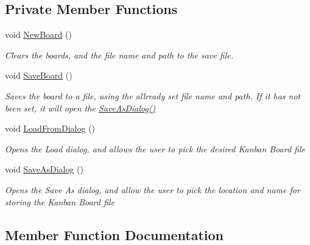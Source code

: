 \subsection*{Private Member Functions}
\begin{DoxyCompactItemize}
\item 
void \hyperlink{class_kanban_board_1_1_view_model_1_1_main_view_model_a7762a9f2331ec0b68d773570ac185ffc}{New\+Board} ()
\begin{DoxyCompactList}\small\item\em Clears the boards, and the file name and path to the save file. \end{DoxyCompactList}\item 
void \hyperlink{class_kanban_board_1_1_view_model_1_1_main_view_model_aa9116851f4b8e55c05045900745e4c39}{Save\+Board} ()
\begin{DoxyCompactList}\small\item\em Saves the board to a file, using the allready set file name and path. If it has not been set, it will open the \hyperlink{class_kanban_board_1_1_view_model_1_1_main_view_model_abdee48fdc9e1e61ffe046dc1d13c59dd}{Save\+As\+Dialog()} \end{DoxyCompactList}\item 
void \hyperlink{class_kanban_board_1_1_view_model_1_1_main_view_model_aeb9121b810fcc08bc9fbcc26c02092b5}{Load\+From\+Dialog} ()
\begin{DoxyCompactList}\small\item\em Opens the Load dialog, and allows the user to pick the desired Kanban Board file \end{DoxyCompactList}\item 
void \hyperlink{class_kanban_board_1_1_view_model_1_1_main_view_model_abdee48fdc9e1e61ffe046dc1d13c59dd}{Save\+As\+Dialog} ()
\begin{DoxyCompactList}\small\item\em Opens the Save As dialog, and allow the user to pick the location and name for storing the Kanban Board file \end{DoxyCompactList}\end{DoxyCompactItemize}


\subsection{Member Function Documentation}
\hypertarget{class_kanban_board_1_1_view_model_1_1_main_view_model_afeac47ff8c81ee187966b321dcd0adfd}{}
